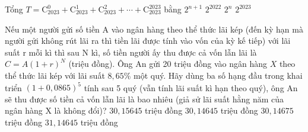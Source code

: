 

\begin{ex}%
	 Tổng $T=\mathrm{C}_{2023}^0+\mathrm{C}_{2023}^1+\mathrm{C}_{2023}^2+\cdots+\mathrm{C}_{2023}^{2023}$ bằng
	 \choice
		{$2^{n+1}$} 
		 {$2^{2022}$}
		 {$2^n$}
		{\True  $2^{2023}$}
\end{ex}

\begin{ex}%
	Nếu một người gửi số tiền A vào ngân hàng theo thể thức lãi kép (đến kỳ hạn mà người gửi không rút lãi ra thì tiền lãi được tính vào vốn của kỳ kế tiếp) với lãi suất  r mỗi kì thì sau N kì, số tiền người ấy thu được cả vốn lẫn lãi là $C=A(1+r)^N$ (triệu đồng). Ông An
	gửi 20 triệu đồng vào ngân hàng $X$ theo thể thức lãi kép với lãi suất $8,65\%$ một quý. Hãy dùng ba số hạng đầu trong khai triển $(1+0,0865)^5$ tính sau 5 quý (vẫn tính lãi suất kì hạn theo quý),  ông An sẽ thu được số tiền cả vốn lẫn lãi là bao nhiêu (giả sử lãi suất hằng năm của ngân hàng X là không đổi)?
	 \choice
		{$30{,}15645$  triệu đồng}
		{\True $30{,}14645$ triệu  đồng}
		{$30{,}14675$ triệu đồng} 
		 {$31{,}14645$ triệu đồng}
\end{ex}

